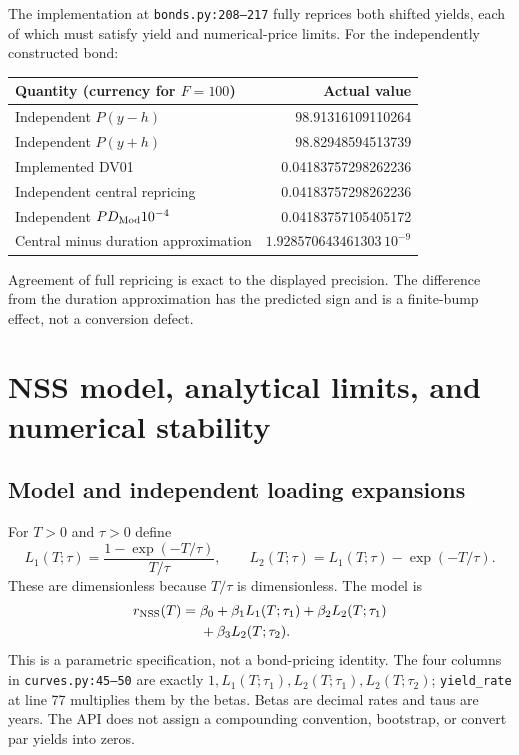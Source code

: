 \documentclass[12pt,a4paper]{article}
\begin{document}
The implementation at \texttt{bonds.py:208--217} fully reprices both
shifted yields, each of which must satisfy yield and numerical-price limits.
For the independently constructed bond:
\begin{center}\small
\begin{tabular}{@{}lr@{}}
\toprule
Quantity (currency for $F=100$) & Actual value\\
\midrule
Independent $P(y-h)$ & 98.91316109110264\\
Independent $P(y+h)$ & 98.82948594513739\\
Implemented DV01 & 0.04183757298262236\\
Independent central repricing & 0.04183757298262236\\
Independent $PD_{\rm Mod}10^{-4}$ & 0.04183757105405172\\
Central minus duration approximation & $1.928570643461303\,10^{-9}$\\
\bottomrule
\end{tabular}
\end{center}
Agreement of full repricing is exact to the displayed precision.
The difference from the duration approximation has the predicted sign
and is a finite-bump effect, not a conversion defect.

\section{NSS model, analytical limits, and numerical stability}
\subsection{Model and independent loading expansions}
For $T>0$ and $\tau>0$ define
\begin{equation}
 L_1(T;\tau)=\frac{1-\exp(-T/\tau)}{T/\tau},\qquad
 L_2(T;\tau)=L_1(T;\tau)-\exp(-T/\tau).
\end{equation}
These are dimensionless because $T/\tau$ is dimensionless. The model is
\begin{equation}\label{eq:nss}
 \begin{split}
 r_{\rm NSS}(T)={}&\beta_0+\beta_1 L_1(T;\tau_1)
                  +\beta_2 L_2(T;\tau_1)\\
                 &+\beta_3 L_2(T;\tau_2).
 \end{split}
\end{equation}
This is a parametric specification, not a bond-pricing identity.
The four columns in \texttt{curves.py:45--50} are exactly
$1,L_1(T;\tau_1),L_2(T;\tau_1),L_2(T;\tau_2)$;
\texttt{yield\_rate} at line 77 multiplies them by the betas.
Betas are decimal rates and taus are years. The API does not assign a
compounding convention, bootstrap, or convert par yields into zeros.
\end{document}
